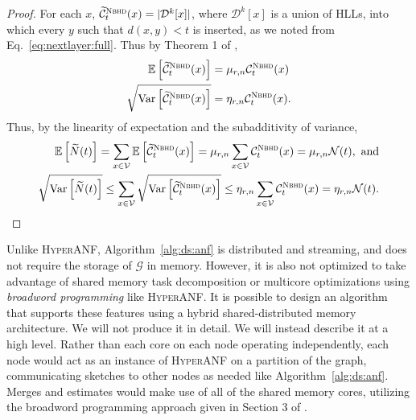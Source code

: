 \documentclass[10]{article}
\newcommand{\algoname}[1]{\textnormal{\textsc{#1}}}
\newcommand{\E}{\mathbb{E}}
\newcommand{\Var}{\mathrm{Var}}
\begin{document}
\begin{proof}
For each $x$, $\widetilde{\mathcal{C}}^{\algoname{Nbhd}}_t(x) = |\mathcal{D}^k[x]|$, where $\mathcal{D}^k[x]$ is a union of \algoname{HLL}s, into which every $y$ such that $d(x,y) < t$ is inserted, as we noted from Eq.~\eqref{eq:nextlayer:full}. 
Thus by Theorem 1 of \cite{flajolet2007hyperloglog}, 
%
\begin{align*}
\E \left [ \widetilde{\mathcal{C}}^{\algoname{Nbhd}}_t(x) \right ] 
&= \mu_{r,n} \mathcal{C}^{\algoname{Nbhd}}_t(x) \\
\sqrt{\Var \left [ \widetilde{\mathcal{C}}^{\algoname{Nbhd}}_t(x) \right ]} 
&= \eta_{r,n} \mathcal{C}^{\algoname{Nbhd}}_t(x).
\end{align*}
%
Thus, by the linearity of expectation and the subadditivity of variance, 
\begin{align*}
\E \left [ \widetilde{N}(t) \right ] 
= \sum_{x \in \mathcal{V}} \E \left [ \widetilde{\mathcal{C}}^{\algoname{Nbhd}}_t(x) \right ]  
= \mu_{r, n} \sum_{x \in \mathcal{V}} \mathcal{C}^{\algoname{Nbhd}}_t(x)  
= \mu_{r,n} \mathcal{N}(t),
\textnormal{ and} \\
%
%
\sqrt{\Var \left [ \widetilde{N}(t) \right ]} 
\leq \sum_{x \in \mathcal{V}} \sqrt{\Var \left [ \widetilde{\mathcal{C}}^{\algoname{Nbhd}}_t(x) \right ]}  
\leq \eta_{r, n} \sum_{x \in \mathcal{V}} \mathcal{C}^{\algoname{Nbhd}}_t(x)  
= \eta_{r, n} \mathcal{N}(t).
\end{align*}

\end{proof}



Unlike \algoname{HyperANF}, Algorithm~\ref{alg:ds:anf} is distributed and streaming, and does not require the storage of $\mathcal{G}$ in memory. 
However, it is also not optimized to take advantage of shared memory task decomposition or multicore optimizations using \emph{broadword programming} like \algoname{HyperANF}.
It is possible to design an algorithm that supports these features using a hybrid shared-distributed memory architecture. 
We will not produce it in detail.
We will instead describe it at a high level.
Rather than each core on each node operating independently, each node would act as an instance of \algoname{HyperANF} on a partition of the graph, communicating sketches to other nodes as needed like Algorithm~\ref{alg:ds:anf}.
Merges and estimates would make use of all of the shared memory cores, utilizing the broadword programming approach given in Section 3 of \cite{boldi2011hyperanf}.
\end{document}
